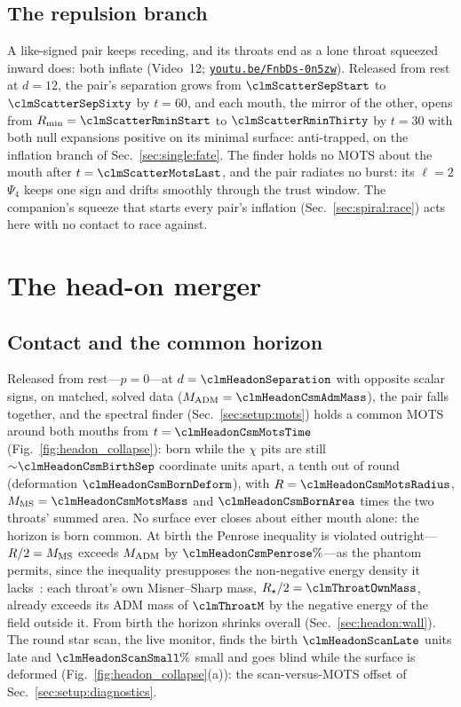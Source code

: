 \documentclass[twocolumn,floatfix,aps,prd,superscriptaddress,nofootinbib]{revtex4-2}
\begin{document}
\subsection{The repulsion branch}
\label{sec:pair:recede}

A like-signed pair keeps receding, and its throats end as a lone throat squeezed inward does: both inflate (Video~12; \href{https://youtu.be/FnbDs-0n5zw}{\nolinkurl{youtu.be/FnbDs-0n5zw}}). Released from rest at $d=12$, the pair's separation grows from $\clmScatterSepStart$ to $\clmScatterSepSixty$ by $t=60$, and each mouth, the mirror of the other, opens from $R_{\min}=\clmScatterRminStart$ to $\clmScatterRminThirty$ by $t=30$ with both null expansions positive on its minimal surface: anti-trapped, on the inflation branch of Sec.~\ref{sec:single:fate}. The finder holds no MOTS about the mouth after $t=\clmScatterMotsLast$, and the pair radiates no burst: its $\ell=2$ $\Psi_4$ keeps one sign and drifts smoothly through the trust window. The companion's squeeze that starts every pair's inflation (Sec.~\ref{sec:spiral:race}) acts here with no contact to race against.

\section{The head-on merger}
\label{sec:headon}

\subsection{Contact and the common horizon}
\label{sec:headon:contact}

Released from rest---$p=0$---at $d=\clmHeadonSeparation$ with opposite scalar signs, on matched, solved data ($M_{\rm ADM}=\clmHeadonCsmAdmMass$), the pair falls together, and the spectral finder (Sec.~\ref{sec:setup:mots}) holds a common MOTS around both mouths from $t=\clmHeadonCsmMotsTime$ (Fig.~\ref{fig:headon_collapse}): born while the $\chi$ pits are still ${\sim}\clmHeadonCsmBirthSep$ coordinate units apart, a tenth out of round (deformation $\clmHeadonCsmBornDeform$), with $R=\clmHeadonCsmMotsRadius$, $M_{\rm MS}=\clmHeadonCsmMotsMass$ and $\clmHeadonCsmBornArea$ times the two throats' summed area. No surface ever closes about either mouth alone: the horizon is born common. At birth the Penrose inequality is violated outright---$R/2=M_{\rm MS}$ exceeds $M_{\rm ADM}$ by $\clmHeadonCsmPenrose\%$---as the phantom permits, since the inequality presupposes the non-negative energy density it lacks~\cite{huisken2001,mars2009}: each throat's own Misner--Sharp mass, $R_\star/2=\clmThroatOwnMass$, already exceeds its ADM mass of $\clmThroatM$ by the negative energy of the field outside it. From birth the horizon shrinks overall (Sec.~\ref{sec:headon:wall}). The round star scan, the live monitor, finds the birth $\clmHeadonScanLate$ units late and $\clmHeadonScanSmall\%$ small and goes blind while the surface is deformed (Fig.~\ref{fig:headon_collapse}(a)): the scan-versus-MOTS offset of Sec.~\ref{sec:setup:diagnostics}.
\end{document}
